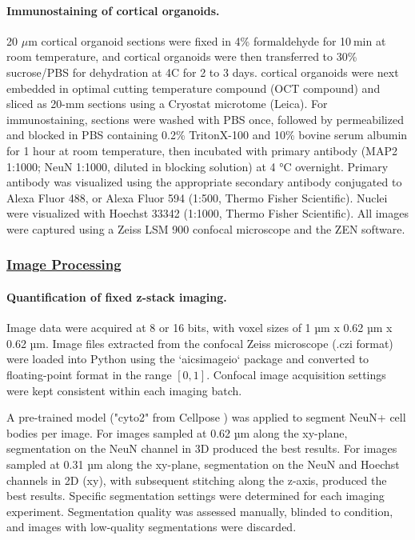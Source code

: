 \documentclass[12pt]{article}
\begin{document}
\paragraph{Immunostaining of cortical organoids.}
20 $\mu$m cortical organoid sections were fixed in 4\% formaldehyde for 10 min at room temperature, and cortical organoids were then transferred to 30\% sucrose/PBS for dehydration at 4C for 2 to 3 days. cortical organoids were next embedded in optimal cutting temperature compound (OCT compound) and sliced as 20-mm sections using a Cryostat microtome (Leica). For immunostaining, sections were washed with PBS once, followed by permeabilized and blocked in PBS containing 0.2\% TritonX-100 and 10\% bovine serum albumin for 1 hour at room temperature, then incubated with primary antibody (MAP2 1:1000; NeuN 1:1000, diluted in blocking solution) at 4 °C overnight. Primary antibody was visualized using the appropriate secondary antibody conjugated to Alexa Fluor 488, or Alexa Fluor 594 (1:500, Thermo Fisher Scientific). Nuclei were visualized with Hoechst 33342 (1:1000, Thermo Fisher Scientific). All images were captured using a Zeiss LSM 900 confocal microscope and the ZEN software.  \subsubsection{\underline{Image Processing}}

\paragraph{Quantification of fixed z-stack imaging.}
Image data were acquired at 8 or 16 bits, with voxel sizes of 1 µm x 0.62 µm x 0.62 µm. Image files extracted from the confocal Zeiss microscope (.czi format) were loaded into Python using the `aicsimageio` package and converted to floating-point format in the range $[0,1]$. Confocal image acquisition settings were kept consistent within each imaging batch.

A pre-trained model ("cyto2" from Cellpose \cite{Stringer2021-yn}) was applied to segment NeuN+ cell bodies per image. For images sampled at 0.62 µm along the xy-plane, segmentation on the NeuN channel in 3D produced the best results. For images sampled at 0.31 µm along the xy-plane, segmentation on the NeuN and Hoechst channels in 2D (xy), with subsequent stitching along the z-axis, produced the best results. Specific segmentation settings were determined for each imaging experiment. Segmentation quality was assessed manually, blinded to condition, and images with low-quality segmentations were discarded.
\end{document}

